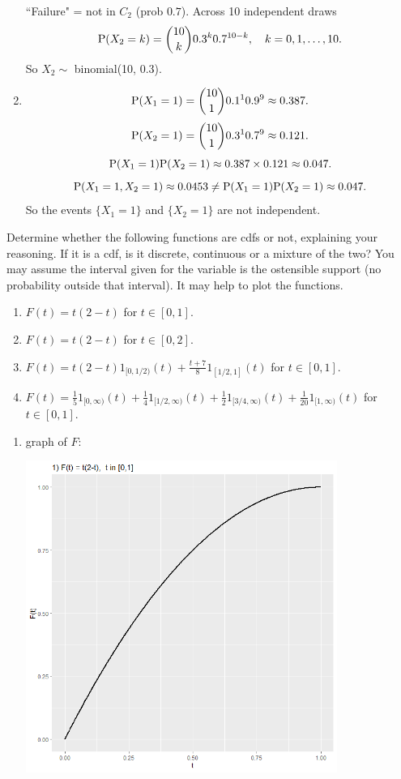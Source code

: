 \documentclass[12pt]{article}
\newcommand{\Prob}{{\rm P}}
\newenvironment{problem}[2][Problem]{\begin{trivlist}
\item[\hskip \labelsep {\bfseries #1}\hskip \labelsep {\bfseries #2.}]}
{\end{trivlist}}
\begin{document}
\begin{problem}{2}
\begin{enumerate}
    ``Failure" = not in $C_2$ (prob $0.7$). Across 10 independent draws
    \[
      \Prob(X_2 = k) = \binom{10}{k} 0.3^k 0.7^{10-k},\quad k=0,1,\ldots,10.
    \]
    So $X_2 \sim$ binomial(10, 0.3).
    \item
    \[
      \Prob(X_1=1) = \binom{10}{1}0.1^1 0.9^9 \approx 0.387.
    \]
    \[
      \Prob(X_2=1) = \binom{10}{1}0.3^1 0.7^9 \approx 0.121.
    \]
    \[
      \Prob(X_1=1)\Prob(X_2=1) \approx 0.387 \times 0.121 \approx 0.047.
    \]
    \[
      \Prob(X_1=1,X_2=1) \approx 0.0453 \ne
      \Prob(X_1=1)\Prob(X_2=1) \approx 0.047.
    \]
    So the events $\{X_1=1\}$ and $\{X_2=1\}$ are not independent.
  \end{enumerate}
\end{problem}

\begin{problem}{3}
  Determine whether the following functions are cdfs or not, 
  explaining your reasoning. If it is a cdf, is it discrete, continuous 
  or a mixture of the two? You may assume the interval given for the variable 
  is the ostensible support (no probability outside that interval). 
  It may help to plot the functions.
  \begin{enumerate}
    \item $F(t) = t(2-t)$ for $t \in [0,1]$.
    \item $F(t) = t(2-t)$ for $t \in [0,2]$.
    \item $F(t) = t(2-t)1_{[0,1/2)}(t) + \frac{t+7}{8}1_{[1/2,1]}(t)$ 
    for $t \in [0,1]$.
    \item $F(t) = \frac15 1_{[0,\infty)}(t) + \frac14 1_{[1/2,\infty)}(t)
    + \frac12 1_{[3/4,\infty)}(t) + \frac{1}{20} 1_{[1,\infty)}(t)$
    for $t \in [0,1]$.
  \end{enumerate}
  \pagebreak
  \begin{enumerate}
    \item graph of $F$:
    \begin{center}
      \includegraphics[width=0.8\textwidth]{3a.png}

\end{center}
\end{enumerate}
\end{problem}
\end{document}
